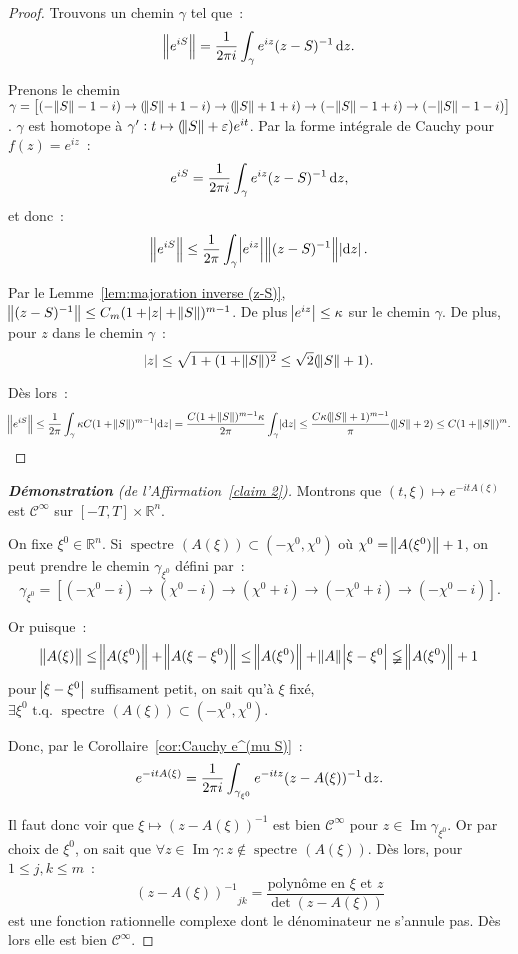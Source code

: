 \documentclass{report}
\DeclareMathOperator{\spectreOperator}{spectre\!}
\DeclareMathOperator{\Imapp}{Im}
\newcommand{\R}{{\mathbb R}}
\newcommand{\tq}{\text{ t.q. }}
\newcommand{\st}{\tq}
\newcommand{\spectre}[1]{{\spectreOperator\left(#1\right)}}
\theoremstyle{definition}
\theoremstyle{remark}
\begin{document}
\begin{proof} Trouvons un chemin $\gamma$ tel que~:
\[\norm {e^{iS}} = \frac 1{2\pi i}\int_\gamma e^{iz}(z-S)^{-1}\dif z.\]

Prenons le chemin $\gamma = \left[(-\norm S-1 - i) \to (\norm S+1-i) \to (\norm S+1+i) \to (-\norm S-1+i) \to (-\norm S-1-i)\right]$. $\gamma$ est homotope à
$\gamma' : t \mapsto (\norm S + \varepsilon)e^{it}$. Par la forme intégrale de Cauchy pour $f(z) = e^{iz}$~:
\[e^{iS} = \frac 1{2\pi i}\int_\gamma e^{iz}(z-S)^{-1}\dif z,\]
et donc~:
\[\norm {e^{iS}} \leq \frac 1{2\pi}\int_\gamma\abs {e^{iz}}\norm {(z-S)^{-1}}\abs {\dif z}.\]

Par le Lemme~\ref{lem:majoration inverse (z-S)}, $\norm {(z-S)^{-1}} \leq C_m(1+\abs z + \norm S)^{m-1}$. De plus $\abs {e^{iz}} \leq \kappa$ sur le chemin $\gamma$.
De plus, pour $z$ dans le chemin $\gamma$~:
\[\abs z \leq \sqrt {1 + (1+\norm S)^2} \leq \sqrt 2(\norm S + 1).\]

Dès lors~:
\[\norm {e^{iS}} \leq \frac 1{2\pi}\int_\gamma\kappa C(1+\norm S)^{m-1}\abs {\dif z} = \frac {C(1+\norm S)^{m-1}\kappa}{2\pi}\int_\gamma\abs {\dif z}
	\leq \frac {C\kappa(\norm S + 1)^{m-1}}\pi(\norm S + 2) \leq C(1+\norm S)^m.\]
\end{proof}

\begin{proof}[\textnormal {\textbf {Démonstration} (de l'Affirmation~\ref{claim 2})}] Montrons que $(t, \xi) \mapsto e^{-itA(\xi)}$ est $\mathcal C^\infty$ sur $[-T, T] \times \R^n$.

On fixe $\xi^0 \in \R^n$. Si $\spectre {A(\xi)} \subset (-\chi^0, \chi^0)$ où
$\chi^0 = \norm {A(\xi^0)}+1$, on peut prendre le chemin $\gamma_{\xi^0}$ défini par~:
\[\gamma_{\xi^0} = \left[(-\chi^0-i) \to (\chi^0-i) \to (\chi^0+i) \to (-\chi^0+i) \to (-\chi^0-i)\right].\]

Or puisque~:
\[\norm {A(\xi)} \leq \norm {A(\xi^0)} + \norm {A(\xi-\xi^0)} \leq \norm {A(\xi^0)} + \norm A\abs {\xi-\xi^0} \lneqq \norm {A(\xi^0)} + 1\]
pour $\abs {\xi-\xi^0}$ suffisament petit, on sait qu'à $\xi$ fixé, $\exists \xi^0 \st \spectre {A(\xi)} \subset (-\chi^0, \chi^0)$.

Donc, par le Corollaire~\ref{cor:Cauchy e^(mu S)}~:
\begin{equation}\label{eq:forme intégrale Cauchy e^(-itA(xi))}
	e^{-itA(\xi)} = \frac 1{2\pi i}\int_{\gamma_{\xi^0}}e^{-itz}(z-A(\xi))^{-1}\dif z.
\end{equation}

Il faut donc voir que $\xi \mapsto (z-A(\xi))^{-1}$ est bien $\mathcal C^\infty$ pour $z \in \Imapp \gamma_{\xi^0}$. Or par choix de $\xi^0$, on sait que
$\forall z \in \Imapp \gamma : z \not \in \spectre {A(\xi)}$. Dès lors, pour $1 \leq j, k \leq m$~:
\[{(z-A(\xi))^{-1}}_{jk} = \frac {\text{polynôme en $\xi$ et $z$}}{\det(z-A(\xi))}\]
est une fonction rationnelle complexe dont le dénominateur ne s'annule pas. Dès lors elle est bien $\mathcal C^\infty$.
\end{proof}
\end{document}

